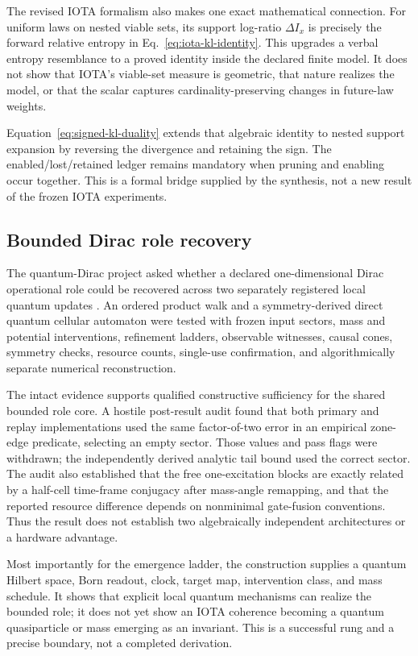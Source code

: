 The revised IOTA formalism also makes one exact mathematical connection. For
uniform laws on nested viable sets, its support log-ratio $\Delta I_x$ is
precisely the forward relative entropy in
Eq.~\eqref{eq:iota-kl-identity}. This upgrades a verbal entropy resemblance to a
proved identity inside the declared finite model. It does not show that IOTA's
viable-set measure is geometric, that nature realizes the model, or that the
scalar captures cardinality-preserving changes in future-law weights.

Equation~\eqref{eq:signed-kl-duality} extends that algebraic identity to nested
support expansion by reversing the divergence and retaining the sign. The
enabled/lost/retained ledger remains mandatory when pruning and enabling occur
together. This is a formal bridge supplied by the synthesis, not a new result
of the frozen IOTA experiments.

\subsection{Bounded Dirac role recovery}

The quantum-Dirac project asked whether a declared one-dimensional Dirac
operational role could be recovered across two separately registered local
quantum updates \citep{Clark2026DiracRole}. An ordered product walk and a
symmetry-derived direct quantum cellular automaton were tested with frozen
input sectors, mass and potential interventions, refinement ladders, observable
witnesses, causal cones, symmetry checks, resource counts, single-use
confirmation, and algorithmically separate numerical reconstruction.

The intact evidence supports qualified constructive sufficiency for the shared
bounded role core. A hostile post-result audit found that both primary and
replay implementations used the same factor-of-two error in an empirical
zone-edge predicate, selecting an empty sector. Those values and pass flags were
withdrawn; the independently derived analytic tail bound used the correct
sector. The audit also established that the free one-excitation blocks are
exactly related by a half-cell time-frame conjugacy after mass-angle remapping,
and that the reported resource difference depends on nonminimal gate-fusion
conventions. Thus the result does not establish two algebraically independent
architectures or a hardware advantage.

Most importantly for the emergence ladder, the construction supplies a quantum
Hilbert space, Born readout, clock, target map, intervention class, and mass
schedule. It shows that explicit local quantum mechanisms can realize the
bounded role; it does not yet show an IOTA coherence becoming a quantum
quasiparticle or mass emerging as an invariant. This is a successful rung and a
precise boundary, not a completed derivation.

